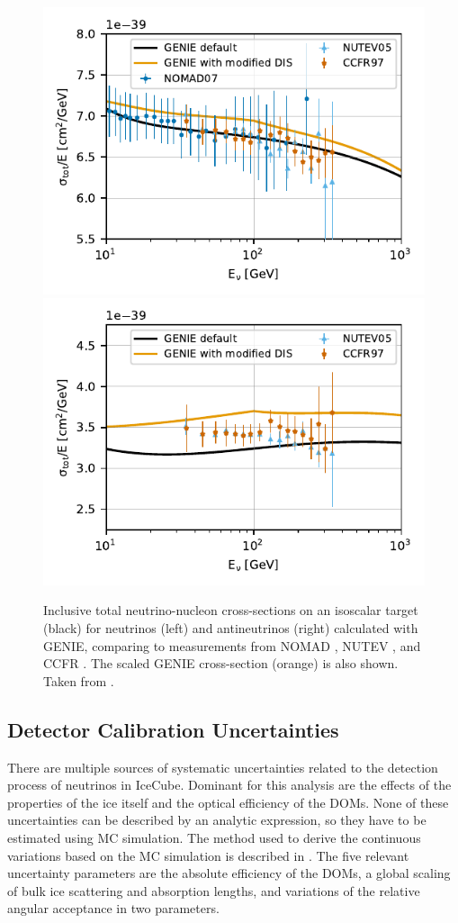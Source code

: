 \begin{figure}
    \centering 
    \includegraphics[width=0.49\linewidth]{figures/simulation_and_processing/cross_sections/NuMu_CC_iso_comp_to_data__upd_style.pdf}
    \includegraphics[width=0.49\linewidth]{figures/simulation_and_processing/cross_sections/NuMu_Bar_CC_iso_comp_to_data__upd_style.pdf}
    
    \caption[Inclusive total neutrino-nucleon cross-sections]{Inclusive total neutrino-nucleon cross-sections on an isoscalar target (black) for neutrinos (left) and antineutrinos (right) calculated with GENIE, comparing to measurements from NOMAD \cite{xsec_data_nomad}, NUTEV \cite{xsec_data_nutev}, and CCFR \cite{xsec_data_ccfr}. The scaled GENIE cross-section (orange) is also shown. Taken from \cite{OVS_PRD}.}
\end{figure}


\subsection{Detector Calibration Uncertainties}

There are multiple sources of systematic uncertainties related to the detection process of neutrinos in IceCube. Dominant for this analysis are the effects of the properties of the ice itself and the optical efficiency of the DOMs. None of these uncertainties can be described by an analytic expression, so they have to be estimated using MC simulation. The method used to derive the continuous variations based on the MC simulation is described in . The five relevant uncertainty parameters are the absolute efficiency of the DOMs, a global scaling of bulk ice scattering and absorption lengths, and variations of the relative angular acceptance in two parameters.


